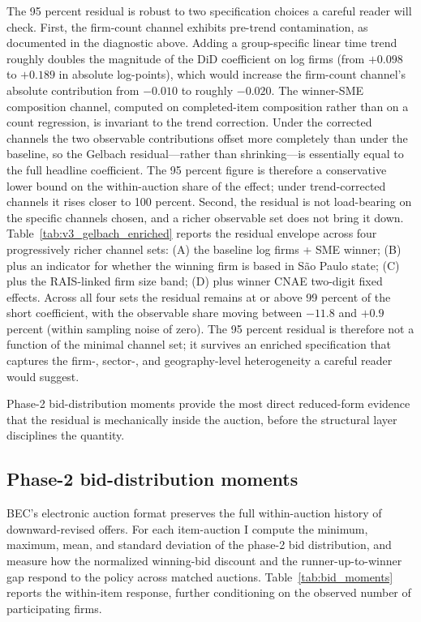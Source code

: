 The 95 percent residual is robust to two specification choices a careful reader will check. First, the firm-count channel exhibits pre-trend contamination, as documented in the diagnostic above. Adding a group-specific linear time trend roughly doubles the magnitude of the DiD coefficient on log firms (from $+0.098$ to $+0.189$ in absolute log-points), which would increase the firm-count channel's absolute contribution from $-0.010$ to roughly $-0.020$. The winner-SME composition channel, computed on completed-item composition rather than on a count regression, is invariant to the trend correction. Under the corrected channels the two observable contributions offset more completely than under the baseline, so the Gelbach residual---rather than shrinking---is essentially equal to the full headline coefficient. The 95 percent figure is therefore a conservative lower bound on the within-auction share of the effect; under trend-corrected channels it rises closer to 100 percent. Second, the residual is not load-bearing on the specific channels chosen, and a richer observable set does not bring it down. Table~\ref{tab:v3_gelbach_enriched} reports the residual envelope across four progressively richer channel sets: (A) the baseline log firms + SME winner; (B) plus an indicator for whether the winning firm is based in S\~ao Paulo state; (C) plus the RAIS-linked firm size band; (D) plus winner CNAE two-digit fixed effects. Across all four sets the residual remains at or above 99 percent of the short coefficient, with the observable share moving between $-11.8$ and $+0.9$ percent (within sampling noise of zero). The 95 percent residual is therefore not a function of the minimal channel set; it survives an enriched specification that captures the firm-, sector-, and geography-level heterogeneity a careful reader would suggest.

Phase-2 bid-distribution moments provide the most direct reduced-form evidence that the residual is mechanically inside the auction, before the structural layer disciplines the quantity.

\subsection{Phase-2 bid-distribution moments}

BEC's electronic auction format preserves the full within-auction history of downward-revised offers. For each item-auction I compute the minimum, maximum, mean, and standard deviation of the phase-2 bid distribution, and measure how the normalized winning-bid discount and the runner-up-to-winner gap respond to the policy across matched auctions. Table~\ref{tab:bid_moments} reports the within-item response, further conditioning on the observed number of participating firms.

